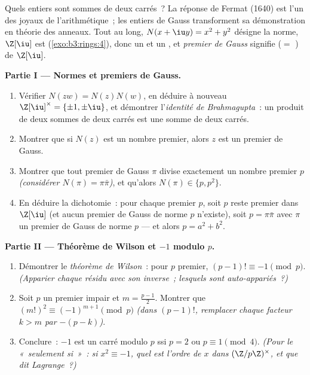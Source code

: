\begin{problem}\label{pb:b3:rings:1}
Quels entiers sont sommes de deux carrés~? La réponse de Fermat
(1640) est l'un des joyaux de l'arithmétique~; les entiers de
Gauss transforment sa démonstration en théorie des anneaux. Tout
au long, $N(x + \iu y) = x^2 + y^2$ désigne la norme, $\Z[\iu]$
est  (\cref{exo:b3:rings:4}), donc un  et un , et
\emph{premier de Gauss} signifie  ($=$
) de $\Z[\iu]$.

\medskip
\noindent\textbf{Partie I --- Normes et premiers de Gauss.}
\begin{enumerate}
  \item Vérifier $N(zw) = N(z)N(w)$, en déduire à nouveau
        $\Z[\iu]^\times = \{\pm1, \pm\iu\}$, et démontrer
        l'\emph{identité de Brahmagupta}~: un produit de deux
        sommes de deux carrés est une somme de deux carrés.
  \item Montrer que si $N(z)$ est un nombre premier, alors $z$
        est un premier de Gauss.
  \item Montrer que tout premier de Gauss $\pi$ divise
        exactement un nombre premier $p$ \emph{(considérer
        $N(\pi) = \pi\bar\pi$)}, et qu'alors $N(\pi) \in \{p,
        p^2\}$.
  \item En déduire la dichotomie~: pour chaque premier $p$, soit
        $p$ reste premier dans $\Z[\iu]$ (et aucun premier de
        Gauss de norme $p$ n'existe), soit $p = \pi\bar\pi$ avec
        $\pi$ un premier de Gauss de norme $p$ --- et alors $p =
        a^2 + b^2$.
\end{enumerate}

\medskip
\noindent\textbf{Partie II --- Théorème de Wilson et $-1$
modulo $p$.}
\begin{enumerate}[resume]
  \item Démontrer le \emph{théorème de Wilson}~: pour $p$
        premier, $(p-1)! \equiv -1 \pmod p$. \emph{(Apparier
        chaque résidu avec son inverse~; lesquels sont
        auto-appariés~?)}
  \item Soit $p$ un premier impair et $m = \frac{p-1}2$. Montrer
        que $(m!)^2 \equiv (-1)^{m+1} \pmod p$ \emph{(dans
        $(p-1)!$, remplacer chaque facteur $k > m$ par $-(p -
        k)$)}.
  \item Conclure~: $-1$ est un carré modulo $p$ ssi $p = 2$ ou
        $p \equiv 1 \pmod 4$. \emph{(Pour le «~seulement si~»~:
        si $x^2 \equiv -1$, quel est l'ordre de $x$ dans
        $(\Z/p\Z)^\times$, et que dit Lagrange~?)}
\end{enumerate}


\end{problem}
